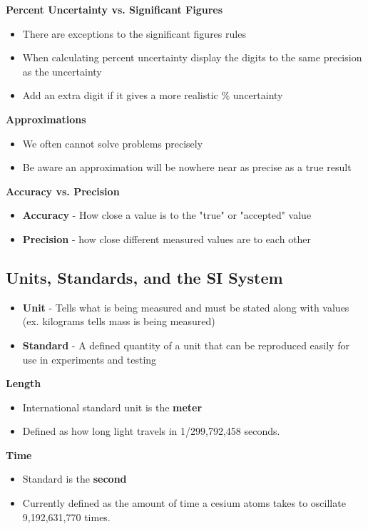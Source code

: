 \textbf{Percent Uncertainty vs. Significant Figures}
    \begin{itemize}
        \item There are exceptions to the significant figures rules
        \item When calculating percent uncertainty display the digits to the same precision as the uncertainty
        \item Add an extra digit if it gives a more realistic \% uncertainty
    \end{itemize}
    
\textbf{Approximations}
    \begin{itemize}
        \item We often cannot solve problems precisely
        \item Be aware an approximation will be nowhere near as precise as a true result
    \end{itemize}

\textbf{Accuracy vs. Precision}
    \begin{itemize}
        \item \textbf{Accuracy} - How close a value is to the "true" or "accepted" value
        \item \textbf{Precision} - how close different measured values are to each other
    \end{itemize}

\subsection{Units, Standards, and the SI System}
    \begin{itemize}
        \item \textbf{Unit} - Tells what is being measured and must be stated along with values (ex. kilograms tells mass is being measured)
        \item \textbf{Standard} - A defined quantity of a unit that can be reproduced easily for use in experiments and testing
    \end{itemize}
\textbf{Length}
    \begin{itemize}
        \item International standard unit is the \textbf{meter}
        \item Defined as how long light travels in 1/299,792,458 seconds.
    \end{itemize}
    
\textbf{Time}
    \begin{itemize}
        \item Standard is the \textbf{second}
        \item Currently defined as the amount of time a cesium atoms takes to oscillate 9,192,631,770 times.
    \end{itemize}
    

